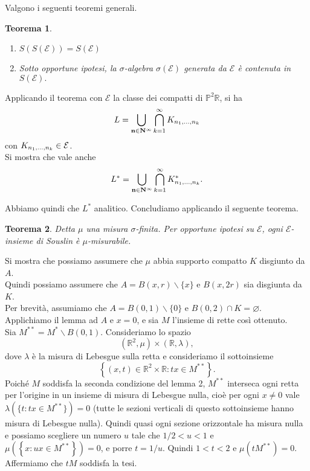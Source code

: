 \documentclass[11pt]{beamer} %
\newcommand{\R}{\mathbb{R}}
\renewcommand{\P}{\mathbb{P}}
\newcommand{\E}{\mathcal{E}}
\newcommand{\<}{\langle}
\renewcommand{\>}{\rangle}
\theoremstyle{theorem}
\newtheorem{teo}{Teorema}
\theoremstyle{theorem}
\theoremstyle{theorem}
\theoremstyle{theorem}
\theoremstyle{theorem}
\begin{document}
\begin{frame}[fragile]
Valgono i seguenti teoremi generali.

\begin{teo}
	\begin{enumerate}[i]
		\item $S(S(\mathcal{E}))=S(\mathcal{E})$\\
		\item Sotto opportune ipotesi, la $\sigma$-algebra $\sigma(\mathcal{E})$ generata da $\mathcal{E}$ è contenuta in $S(\mathcal{E}).$
	\end{enumerate}
\end{teo}

Applicando il teorema con $\E$ la classe dei compatti di $\P^2 \R$, si ha
$$L=\bigcup_{{\bf n}\in{\bf N}^\infty}\bigcap_{k=1}^\infty K_{n_1,\ldots,n_k}$$
con $K_{n_1,\ldots,n_k}\in {\cal E}$.\\
Si mostra che vale anche
$$L^*=\bigcup_{{\bf n}\in{\bf N}^\infty}\bigcap_{k=1}^\infty K_{n_1,\ldots,n_k}^*.$$ 

\end{frame}

\begin{frame}
Abbiamo quindi che $L^*$ analitico. Concludiamo applicando il seguente teorema. \\

\begin{teo}
 	Detta $\mu$ una misura $\sigma$-finita. Per opportune ipotesi su $\E$, ogni $\mathcal{E}$-insieme di Souslin è $\mu$-misurabile.
\end{teo}	
	
	
\end{frame}


\begin{frame}[fragile]

Si mostra che possiamo assumere che $\mu$ abbia supporto compatto $K$ disgiunto da $A$.\\
Quindi possiamo assumere che $A=B(x, r) \backslash\{x\}$ e $B(x, 2 r)$ sia disgiunta da $K$.\\
Per brevità, assumiamo che $A=B(0,1) \backslash\{0\}$ e $B(0,2) \cap K=\varnothing$.\\
Applichiamo il lemma ad $A$ e $x=0$, e sia $M$ l'insieme di rette così ottenuto.\\
Sia $M^{* *}=M^{*} \backslash B(0,1)$. Consideriamo lo spazio
$$
\left(\mathbb{R}^{2}, \mu\right) \times(\mathbb{R}, \lambda),
$$
dove $\lambda$ è la misura di Lebesgue sulla retta e consideriamo il sottoinsieme
$$
\left\{(x, t) \in \mathbb{R}^{2} \times \mathbb{R}: t x \in M^{* *}\right\} .
$$
Poiché $M$ soddisfa la seconda condizione del lemma 2, $M^{**}$ interseca ogni retta per l'origine in un insieme di misura di Lebesgue nulla, cioè per ogni $x \neq 0$ vale $\lambda(\{t: tx \in M^{**}\})=0$ (tutte le sezioni verticali di questo sottoinsieme hanno misura di Lebesgue nulla). Quindi quasi ogni sezione orizzontale ha misura nulla e possiamo scegliere un numero $u$ tale che $1 / 2<u<1$ e $\mu\left(\left\{x: u x \in M^{* *}\right\}\right)=0$, e porre $t=1 / u$. Quindi $1<t<2$ e $\mu\left(t M^{* *}\right)=0$. Affermiamo che $t M$ soddisfa la tesi.\\
\end{frame}
\end{document}
